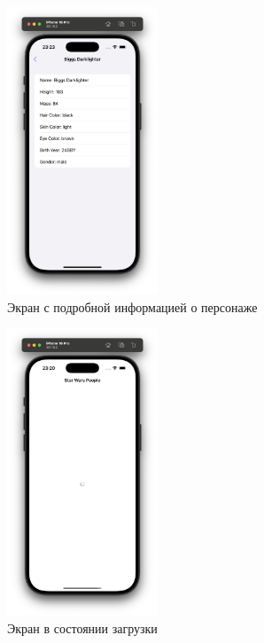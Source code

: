 \documentclass[14pt, russian]{scrartcl}
\begin{document}
\begin{figure}[!htb]
    \centering
    \includegraphics[width=0.4\textwidth]{ios_details.png}
    \caption{Экран с подробной информацией о персонаже}
    \label{fig:details_screen}
\end{figure}

\begin{figure}[!htb]
    \centering
    \includegraphics[width=0.4\textwidth]{ios_loading.png}
    \caption{Экран в состоянии загрузки}
    \label{fig:loading_screen}
\end{figure}
\end{document}
